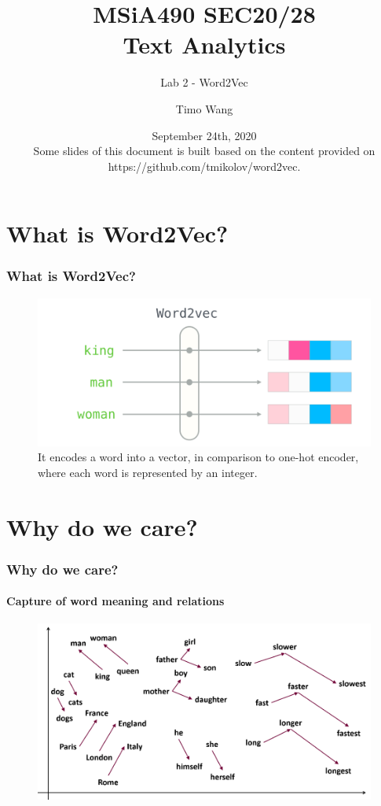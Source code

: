 \documentclass{beamer}
\begin{document}
\title{MSiA490 SEC20/28\\ Text Analytics}
\subtitle{Lab 2 - Word2Vec}
\author{Timo Wang}
\date{September 24th, 2020 \\
{\footnotesize Some slides of this document is built based on the content provided on https://github.com/tmikolov/word2vec.}}

\begin{frame}
    \titlepage
\end{frame}


\section{What is Word2Vec?}
\begin{frame}
    \frametitle{What is Word2Vec?}
    \begin{figure}
        \includegraphics[scale=0.5]{what-is-word2vec}
        \caption{It encodes a word into a vector, in comparison to one-hot encoder, where each word is represented by an integer.}
    \end{figure}
\end{frame}


\section{Why do we care?}
\begin{frame}
    \frametitle{Why do we care?}
    \framesubtitle{Capture of word meaning and relations}
    \begin{figure}
        \includegraphics[scale=0.5]{why-word2vec-1}
    \end{figure}
\end{frame}
\end{document}

